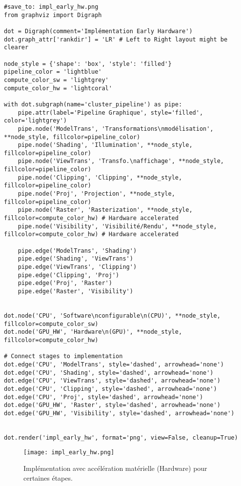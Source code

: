 \documentclass{article}
\begin{document}
\begin{verbatim}
#save_to: impl_early_hw.png
from graphviz import Digraph

dot = Digraph(comment='Implémentation Early Hardware')
dot.graph_attr['rankdir'] = 'LR' # Left to Right layout might be clearer

node_style = {'shape': 'box', 'style': 'filled'}
pipeline_color = 'lightblue'
compute_color_sw = 'lightgrey'
compute_color_hw = 'lightcoral'

with dot.subgraph(name='cluster_pipeline') as pipe:
    pipe.attr(label='Pipeline Graphique', style='filled', color='lightgrey')
    pipe.node('ModelTrans', 'Transformations\nmodélisation', **node_style, fillcolor=pipeline_color)
    pipe.node('Shading', 'Illumination', **node_style, fillcolor=pipeline_color)
    pipe.node('ViewTrans', 'Transfo.\naffichage', **node_style, fillcolor=pipeline_color)
    pipe.node('Clipping', 'Clipping', **node_style, fillcolor=pipeline_color)
    pipe.node('Proj', 'Projection', **node_style, fillcolor=pipeline_color)
    pipe.node('Raster', 'Rasterization', **node_style, fillcolor=compute_color_hw) # Hardware accelerated
    pipe.node('Visibility', 'Visibilité/Rendu', **node_style, fillcolor=compute_color_hw) # Hardware accelerated

    pipe.edge('ModelTrans', 'Shading')
    pipe.edge('Shading', 'ViewTrans')
    pipe.edge('ViewTrans', 'Clipping')
    pipe.edge('Clipping', 'Proj')
    pipe.edge('Proj', 'Raster')
    pipe.edge('Raster', 'Visibility')


dot.node('CPU', 'Software\nconfigurable\n(CPU)', **node_style, fillcolor=compute_color_sw)
dot.node('GPU_HW', 'Hardware\n(GPU)', **node_style, fillcolor=compute_color_hw)

# Connect stages to implementation
dot.edge('CPU', 'ModelTrans', style='dashed', arrowhead='none')
dot.edge('CPU', 'Shading', style='dashed', arrowhead='none')
dot.edge('CPU', 'ViewTrans', style='dashed', arrowhead='none')
dot.edge('CPU', 'Clipping', style='dashed', arrowhead='none')
dot.edge('CPU', 'Proj', style='dashed', arrowhead='none')
dot.edge('GPU_HW', 'Raster', style='dashed', arrowhead='none')
dot.edge('GPU_HW', 'Visibility', style='dashed', arrowhead='none')


dot.render('impl_early_hw', format='png', view=False, cleanup=True)
\end{verbatim}

\begin{figure}[H]
\centering
\texttt{[image: impl\_early\_hw.png]}
\caption{Implémentation avec accélération matérielle (Hardware) pour certaines étapes.}
\label{fig:impl_early_hw}
\end{figure}
\end{document}

